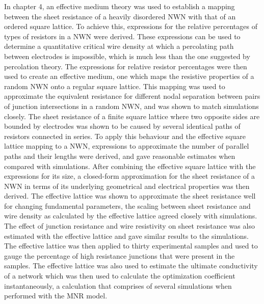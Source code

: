 In chapter 4, an effective medium theory was used to establish a mapping between the sheet resistance of a heavily disordered NWN with that of an ordered square lattice. To achieve this, expressions for the relative percentages of types of resistors in a NWN were derived. These expressions can be used to determine a quantitative critical wire density at which a percolating path between electrodes is impossible, which is much less than the one suggested by percolation theory. The expressions for relative resistor percentages were then used to create an effective medium, one which maps the resistive properties of a random NWN onto a regular square lattice. This mapping was used to approximate the equivalent resistance for different nodal separation between pairs of junction intersections in a random NWN, and was shown to match simulations closely. The sheet resistance of a finite square lattice where two opposite sides are bounded by electrodes was shown to be caused by several identical paths of resistors connected in series. To apply this behaviour and the effective square lattice mapping to a NWN, expressions to approximate the number of parallel paths and their lengths were derived, and gave reasonable estimates when compared with simulations. After combining the effective square lattice with the expressions for its size, a closed-form approximation for the sheet resistance of a NWN in terms of its underlying geometrical and electrical properties was then derived. The effective lattice was shown to approximate the sheet resistance well for changing fundamental parameters, the scaling between sheet resistance and wire density as calculated by the effective lattice agreed closely with simulations. The effect of junction resistance and wire resistivity on sheet resistance was also estimated with the effective lattice and gave similar results to the simulations. The effective lattice was then applied to thirty experimental samples and used to gauge the percentage of high resistance junctions that were present in the samples. The effective lattice was also used to estimate the ultimate conductivity of a network which was then used to calculate the optimization coefficient instantaneously, a calculation that comprises of several simulations when performed with the MNR model.

